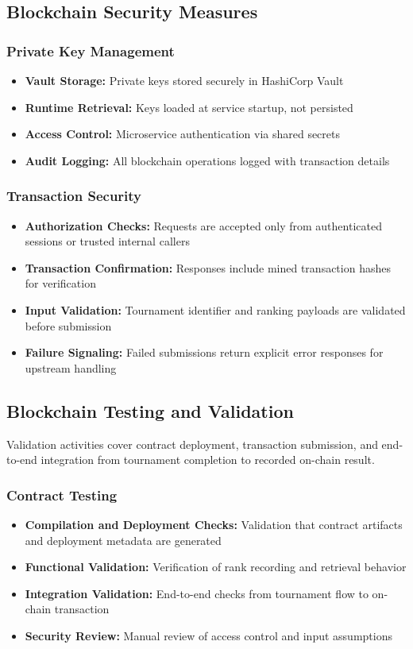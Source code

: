 \documentclass[11pt,a4paper]{report}
\begin{document}
\subsection{Blockchain Security Measures}

\subsubsection{Private Key Management}
\begin{itemize}
  \item \textbf{Vault Storage:} Private keys stored securely in HashiCorp Vault
  \item \textbf{Runtime Retrieval:} Keys loaded at service startup, not persisted
  \item \textbf{Access Control:} Microservice authentication via shared secrets
  \item \textbf{Audit Logging:} All blockchain operations logged with transaction details
\end{itemize}

\subsubsection{Transaction Security}
\begin{itemize}
  \item \textbf{Authorization Checks:} Requests are accepted only from authenticated sessions or trusted internal callers
  \item \textbf{Transaction Confirmation:} Responses include mined transaction hashes for verification
  \item \textbf{Input Validation:} Tournament identifier and ranking payloads are validated before submission
  \item \textbf{Failure Signaling:} Failed submissions return explicit error responses for upstream handling
\end{itemize}

\subsection{Blockchain Testing and Validation}

Validation activities cover contract deployment, transaction submission, and end-to-end integration from tournament completion to recorded on-chain result.

\subsubsection{Contract Testing}
\begin{itemize}
  \item \textbf{Compilation and Deployment Checks:} Validation that contract artifacts and deployment metadata are generated
  \item \textbf{Functional Validation:} Verification of rank recording and retrieval behavior
  \item \textbf{Integration Validation:} End-to-end checks from tournament flow to on-chain transaction
  \item \textbf{Security Review:} Manual review of access control and input assumptions
\end{itemize}
\end{document}
